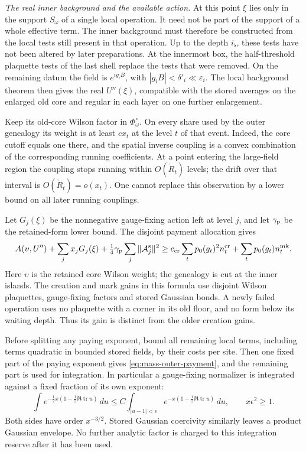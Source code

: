 \documentclass[11pt,letterpaper,reqno]{amsart}
\theoremstyle{definition}
\theoremstyle{remark}
\newcommand{\tr}{\operatorname{tr}}
\begin{document}
\emph{The real inner background and the available action.}
At this point \(\xi\) lies only in the support \(S_\omega\) of a
single local operation. It need not be part of the support of a
whole effective term. The inner background must therefore be
constructed from the local tests still present in that operation.
Up to the depth \(i_\flat\), these tests have not been altered by
later preparations. At the innermost box, the half-threshold
plaquette tests of the last shell replace the tests that were
removed. On the remaining datum the field is \(e^{ig_iB}\), with
\(|g_iB|<\delta'_i\ll\varepsilon_i\).
The local background theorem then gives the real
\(U''(\xi)\), compatible with the stored averages on the enlarged
old core and regular in each layer on one further enlargement.

Keep its old-core Wilson factor in \(\Phi_\omega^\circ\).
On every share used by the outer genealogy its weight is at least
\(cx_t\) at the level \(t\) of that event. Indeed, the core cutoff
equals one there, and the spatial inverse coupling is a convex
combination of the corresponding running coefficients. At a
point entering the large-field region the coupling stops running
within \(O(\check R_t)\) levels; the drift over that interval is
\(O(\check R_t)=o(x_t)\). One cannot replace this observation by a
lower bound on all later running couplings.

Let \(G_j(\xi)\) be the nonnegative gauge-fixing action left at
level \(j\), and let \(\gamma_{\rm p}\) be the retained-form lower
bound. The disjoint payment allocation gives
\begin{equation}\label{eq:mass-outer-payment}
 A(\upsilon,U'')+\sum_jx_jG_j(\xi)
           +\tfrac14\gamma_{\rm p}
                    \sum_j\|\mathcal A_j^{\rm s}\|^2
 \ge c_{\rm cr}\sum_t p_0(g_t)^2n_t^{\rm cr}
                         +\sum_t p_0(g_t)n_t^{\rm mk}.
\end{equation}
Here \(\upsilon\) is the retained core Wilson weight; the genealogy
is cut at the inner islands. The creation and mark gains in this
formula use disjoint Wilson plaquettes, gauge-fixing factors and
stored Gaussian bonds. A newly failed operation uses no plaquette
with a corner in its old floor, and no form below its waiting
depth. Thus its gain is distinct from the older creation gains.

Before splitting any paying exponent, bound all remaining local
terms, including terms quadratic in bounded stored fields, by
their costs per site. Then one fixed part of the paying exponent
gives \eqref{eq:mass-outer-payment}, and the remaining part is used
for integration. In particular a gauge-fixing normalizer is
integrated against a fixed fraction of its own exponent:
\[
 \int e^{-\frac12x(1-\frac12\Re\tr u)}\,du
 \le C\int_{|u-1|<\epsilon}
               e^{-x(1-\frac12\Re\tr u)}\,du,
 \qquad x\epsilon^2\ge1.
\]
Both sides have order \(x^{-3/2}\). Stored Gaussian coercivity
similarly leaves a product Gaussian envelope. No further analytic
factor is charged to this integration reserve after it has been
used.
\end{document}
